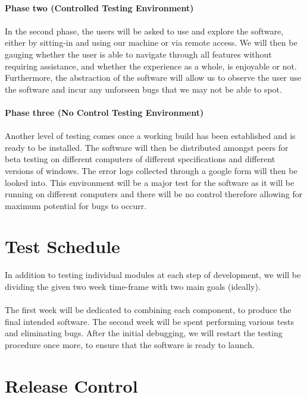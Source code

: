 \documentclass[a4paper, 11pt]{article}
\begin{document}
\paragraph{Phase two (Controlled Testing Environment)}
\paragraph{}
In the second phase, the users will be asked to use and explore the software, either by sitting-in and using our machine or via remote access. We will then be gauging whether the user is able to navigate through all features without requiring assistance, and whether the experience as a whole, is enjoyable or not. Furthermore, the abstraction of the software will allow us to observe the user use the software and incur any unforseen bugs that we may not be able to spot. 
\paragraph{Phase three (No Control Testing Environment)}
\paragraph{}
Another level of testing comes once a working build has been established and is ready to be installed. The software will then be distributed amongst peers for beta testing on different computers of different specifications and different versions of windows. The error logs collected through a google form will then be looked into. This environment will be a major test for the software as it will be running on different computers and there will be no control therefore allowing for maximum potential for bugs to occurr. 
\section{Test Schedule}
In addition to testing individual modules at each step of development, we will be dividing the given two week time-frame with two main goals (ideally).
\paragraph{}
The first week will be dedicated to combining each component, to produce the final intended software. The second week will be spent performing various tests and eliminating bugs. After the initial debugging, we will restart the testing procedure once more, to ensure that the software is ready to launch.
\section{Release Control}
\end{document}
